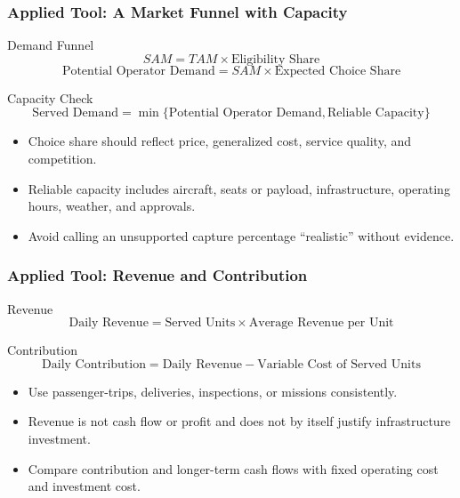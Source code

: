 \documentclass{beamer}
\begin{document}
\begin{frame}[t]
\frametitle{Applied Tool: A Market Funnel with Capacity}
\begin{block}{Demand Funnel}
\[
SAM=TAM\times\text{Eligibility Share}
\]
\[
\text{Potential Operator Demand}=SAM\times\text{Expected Choice Share}
\]
\end{block}
\begin{block}{Capacity Check}
\[
\text{Served Demand}=\min\{\text{Potential Operator Demand},\text{Reliable Capacity}\}
\]
\end{block}
\begin{itemize}
\item Choice share should reflect price, generalized cost, service quality, and competition.
\item Reliable capacity includes aircraft, seats or payload, infrastructure, operating hours, weather, and approvals.
\item Avoid calling an unsupported capture percentage ``realistic'' without evidence.
\end{itemize}
\end{frame}

\begin{frame}[t]
\frametitle{Applied Tool: Revenue and Contribution}
\begin{block}{Revenue}
\[
\text{Daily Revenue}=\text{Served Units}\times\text{Average Revenue per Unit}
\]
\end{block}
\begin{block}{Contribution}
\[
\text{Daily Contribution}=\text{Daily Revenue}-\text{Variable Cost of Served Units}
\]
\end{block}
\begin{itemize}
\item Use passenger-trips, deliveries, inspections, or missions consistently.
\item Revenue is not cash flow or profit and does not by itself justify infrastructure investment.
\item Compare contribution and longer-term cash flows with fixed operating cost and investment cost.
\end{itemize}
\end{frame}
\end{document}
